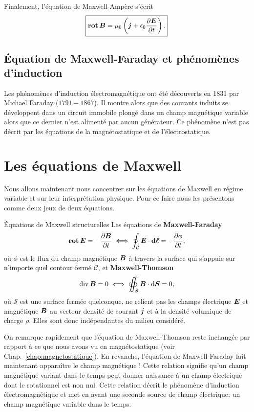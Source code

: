 Finalement, l'équation de Maxwell-Ampère s'écrit
\begin{equation}
	\boxed{\rot \vecb = \mu_0 \left( \vecj + \epsilon_0 \dd{\vece}{t} \right).}
\end{equation}
\subsection{Équation de Maxwell-Faraday et phénomènes d'induction}
Les phénomènes d'induction électromagnétique ont été découverts en 1831
par Michael Faraday ($1791-1867$). Il montre alors que des courants induits 
se développent dans un 
circuit immobile plongé dans un champ magnétique variable alors que ce dernier
n'est alimenté par aucun générateur. Ce phénomène n'est pas décrit par
les équations de la magnétostatique et de l'électrostatique.

\section{Les équations de Maxwell}
Nous allons maintenant nous concentrer sur les équations de Maxwell en régime 
variable et sur leur interprétation physique. Pour ce faire nous les
présentons comme deux jeux de deux équations.

\begin{defn}{Équations de Maxwell structurelles}
	Les équations de \textbf{Maxwell-Faraday}
	\begin{equation}
		\rot \vece = - \dd{\vecb}{t} \iff \oint_\mathcal{C} \vece 
		\cdot \dl = - \dd{\phi}{t},
	\end{equation}
	où $\phi$ est le flux du champ magnétique $\vecb$ à travers la 
	surface qui s'appuie sur n'importe quel contour fermé $\mathcal{C}$, 
	et \textbf{Maxwell-Thomson}
	\begin{equation}
		\div \vecb = 0 \iff \oiint_\mathcal{S} \vecb \cdot \ds = 0,
	\end{equation}
	où $\mathcal{S}$ est une surface fermée quelconque, ne relient pas les champs 
	électrique $\vece$ et magnétique $\vecb$
	au vecteur densité de courant $\vecj$ et à la densité volumique de 
	charge $\rho$. Elles sont donc indépendantes du milieu considéré.
\end{defn}

On remarque rapidement que l'équation de Maxwell-Thomson reste inchangée par rapport
à ce que nous avons vu en magnétostatique (voir Chap.~\ref{chap:magnetostatique}).
En revanche, l'équation de Maxwell-Faraday fait maintenant apparaître le
champ magnétique ! Cette relation signifie
qu'un champ magnétique variant dans le temps peut donner naissance à un champ électrique
dont le rotationnel est non nul. Cette relation décrit le phénomène d'induction 
électromagnétique et met en avant une seconde source de champ électrique: 
un champ magnétique variable dans le temps. 


